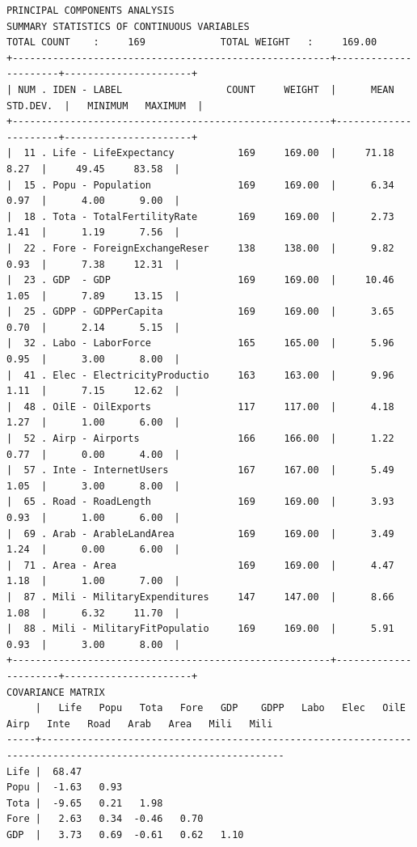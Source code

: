 \documentclass[a4paper,10pt,twocolumn]{article}
\begin{document}
\begin{landscape}
\begin{verbatim}
PRINCIPAL COMPONENTS ANALYSIS
SUMMARY STATISTICS OF CONTINUOUS VARIABLES
TOTAL COUNT    :     169             TOTAL WEIGHT   :     169.00
+-------------------------------------------------------+----------------------+----------------------+
| NUM . IDEN - LABEL                  COUNT     WEIGHT  |      MEAN  STD.DEV.  |   MINIMUM   MAXIMUM  |
+-------------------------------------------------------+----------------------+----------------------+
|  11 . Life - LifeExpectancy           169     169.00  |     71.18      8.27  |     49.45     83.58  |
|  15 . Popu - Population               169     169.00  |      6.34      0.97  |      4.00      9.00  |
|  18 . Tota - TotalFertilityRate       169     169.00  |      2.73      1.41  |      1.19      7.56  |
|  22 . Fore - ForeignExchangeReser     138     138.00  |      9.82      0.93  |      7.38     12.31  |
|  23 . GDP  - GDP                      169     169.00  |     10.46      1.05  |      7.89     13.15  |
|  25 . GDPP - GDPPerCapita             169     169.00  |      3.65      0.70  |      2.14      5.15  |
|  32 . Labo - LaborForce               165     165.00  |      5.96      0.95  |      3.00      8.00  |
|  41 . Elec - ElectricityProductio     163     163.00  |      9.96      1.11  |      7.15     12.62  |
|  48 . OilE - OilExports               117     117.00  |      4.18      1.27  |      1.00      6.00  |
|  52 . Airp - Airports                 166     166.00  |      1.22      0.77  |      0.00      4.00  |
|  57 . Inte - InternetUsers            167     167.00  |      5.49      1.05  |      3.00      8.00  |
|  65 . Road - RoadLength               169     169.00  |      3.93      0.93  |      1.00      6.00  |
|  69 . Arab - ArableLandArea           169     169.00  |      3.49      1.24  |      0.00      6.00  |
|  71 . Area - Area                     169     169.00  |      4.47      1.18  |      1.00      7.00  |
|  87 . Mili - MilitaryExpenditures     147     147.00  |      8.66      1.08  |      6.32     11.70  |
|  88 . Mili - MilitaryFitPopulatio     169     169.00  |      5.91      0.93  |      3.00      8.00  |
+-------------------------------------------------------+----------------------+----------------------+
COVARIANCE MATRIX
     |   Life   Popu   Tota   Fore   GDP    GDPP   Labo   Elec   OilE   Airp   Inte   Road   Arab   Area   Mili   Mili
-----+----------------------------------------------------------------------------------------------------------------
Life |  68.47
Popu |  -1.63   0.93
Tota |  -9.65   0.21   1.98
Fore |   2.63   0.34  -0.46   0.70
GDP  |   3.73   0.69  -0.61   0.62   1.10

\end{verbatim}
\end{landscape}
\end{document}
